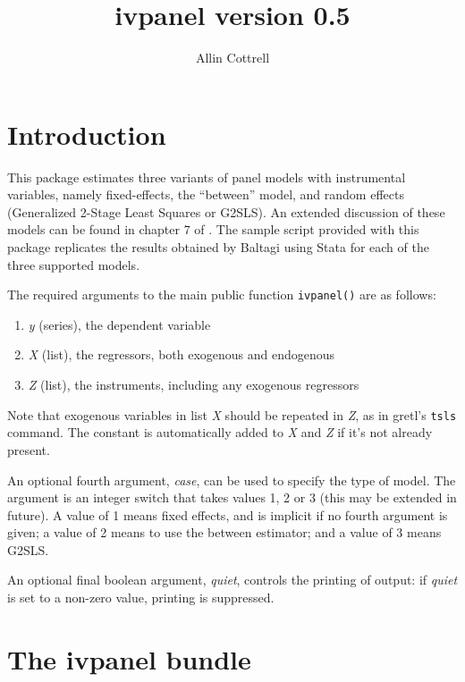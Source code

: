 \documentclass{article}
\begin{document}
\setlength{\parindent}{0pt}
\setlength{\parskip}{1ex}

\newcommand{\argname}[1]{\textsl{#1}}

\title{ivpanel version 0.5}
\author{Allin Cottrell}
\maketitle

\section{Introduction}

This package estimates three variants of panel models with
instrumental variables, namely fixed-effects, the ``between'' model,
and random effects (Generalized 2-Stage Least Squares or G2SLS). An
extended discussion of these models can be found in chapter 7 of
\cite{baltagi05}. The sample script provided with this package
replicates the results obtained by Baltagi using \textsf{Stata} for
each of the three supported models.

The required arguments to the main public function \texttt{ivpanel()}
are as follows:

\begin{enumerate}
\item \argname{y} (series), the dependent variable
\item \argname{X} (list), the regressors, both exogenous and endogenous
\item \argname{Z} (list), the instruments, including any exogenous
  regressors
\end{enumerate}

Note that exogenous variables in list \argname{X} should be repeated
in \argname{Z}, as in gretl's \texttt{tsls} command. The constant is
automatically added to \argname{X} and \argname{Z} if it's not already
present.

An optional fourth argument, \argname{case}, can be used to specify the
type of model. The argument is an integer switch that takes values 1,
2 or 3 (this may be extended in future).  A value of 1 means fixed
effects, and is implicit if no fourth argument is given; a value of 2
means to use the between estimator; and a value of 3 means G2SLS.

An optional final boolean argument, \argname{quiet}, controls the
printing of output: if \argname{quiet} is set to a non-zero value,
printing is suppressed.

\section{The ivpanel bundle}
\end{document}
